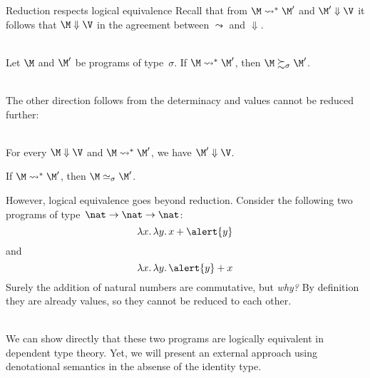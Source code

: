 \begin{frame}{Reduction respects logical equivalence}
  Recall that from $\M \leadsto^* \M'$ and $\M' \Downarrow \V$
  it follows that $\M \Downarrow \V$ in the agreement between $\leadsto$ and
  $\Downarrow$. 
  \\~\\
  \begin{proposition}
    Let $\M$ and $\M'$ be programs of type~$\sigma$. 
    If $\M \leadsto^* \M'$, then $\M \succsim_\sigma \M'$. 
  \end{proposition}
  ~\\
  The other direction follows from the determinacy and values cannot be
  reduced further:
  \\~\\
  \begin{proposition}
    For every $\M \Downarrow \V$ and $\M \leadsto^* \M'$, 
    we have $\M' \Downarrow \V$. 
  \end{proposition}
  \begin{corollary}
    If $\M \leadsto^* \M'$, then $\M \simeq_\sigma \M'$. 
  \end{corollary}
\end{frame}
\begin{frame}
  However, logical equivalence goes beyond reduction.  
  Consider the following two programs of type~$\nat\to\nat\to\nat$:
    \[
      \lambda x.\, \lambda y.\, x + \alert{y}
    \]
    and 
    \[
      \lambda x.\, \lambda y.\, \alert{y} + x
    \]
    Surely the addition of natural numbers are commutative, but \emph{why?}
    By definition they are already values, so they cannot be reduced to
    each other. 
    \\~\\
    \begin{remark}
      We can show directly that these two programs are logically
      equivalent in dependent type theory. Yet, we will present an external
      approach using denotational semantics in the absense of
      the identity type. 
    \end{remark}
\end{frame}

